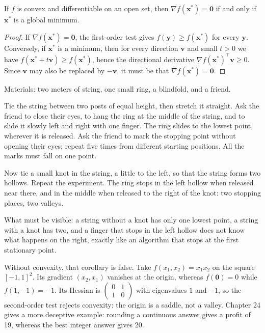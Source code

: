 \begin{akibat}
If $f$ is convex and differentiable on an open set, then
$\nabla f(\mathbf{x}^{*})=\mathbf{0}$ if and only if $\mathbf{x}^{*}$ is a global minimum.
\end{akibat}

\begin{proof}
If $\nabla f(\mathbf{x}^{*})=\mathbf{0}$, the first-order test gives
$f(\mathbf{y})\ge f(\mathbf{x}^{*})$ for every $\mathbf{y}$. Conversely, if
$\mathbf{x}^{*}$ is a minimum, then for every direction $\mathbf{v}$ and small $t>0$ we have
$f(\mathbf{x}^{*}+t\mathbf{v})\ge f(\mathbf{x}^{*})$, hence the directional derivative
$\nabla f(\mathbf{x}^{*})^{\top}\mathbf{v}\ge0$. Since $\mathbf{v}$ may also be replaced by
$-\mathbf{v}$, it must be that $\nabla f(\mathbf{x}^{*})=\mathbf{0}$.
\end{proof}

\begin{tangan}
Materials: two meters of string, one small ring, a blindfold, and a friend.

Tie the string between two posts of equal height, then stretch it straight. Ask the friend to
close their eyes, to hang the ring at the middle of the string, and to slide it slowly left and
right with one finger. The ring slides to the lowest point, wherever it is released. Ask the
friend to mark the stopping point without opening their eyes; repeat five times from different
starting positions. All the marks must fall on one point.

Now tie a small knot in the string, a little to the left, so that the string forms two
hollows. Repeat the experiment. The ring stops in the left hollow when released near there,
and in the middle when released to the right of the knot: two stopping places, two valleys.

What must be visible: a string without a knot has only one lowest point, a string with a knot
has two, and a finger that stops in the left hollow does not know what happens on the right,
exactly like an algorithm that stops at the first stationary point.
\end{tangan}

Without convexity, that corollary is false. Take $f(x_{1},x_{2})=x_{1}x_{2}$ on the square
$[-1,1]^{2}$. Its gradient $(x_{2},x_{1})$ vanishes at the origin, whereas
$f(\mathbf{0})=0$ while $f(1,-1)=-1$. Its Hessian is
$\begin{pmatrix}0&1\\1&0\end{pmatrix}$ with eigenvalues $1$ and $-1$, so the second-order test
rejects convexity: the origin is a saddle, not a valley. Chapter 24 gives a more deceptive
example: rounding a continuous answer gives a profit of 19, whereas the best integer answer
gives 20.

